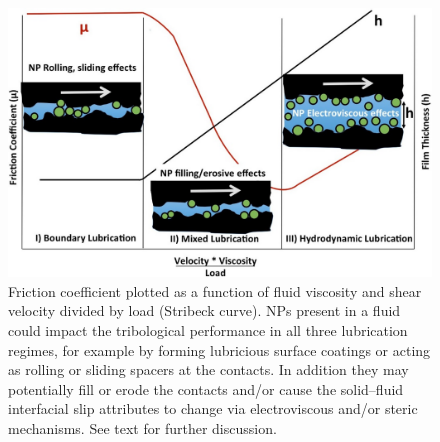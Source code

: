 \begin{figure}[hbtp]
	\centering
	\includegraphics[width=1.0\textwidth]{Chapter-4/fig1_png}
	\caption{Friction coefficient plotted as a function of fluid viscosity and shear velocity divided by load (Stribeck curve). NPs present in a fluid could impact the tribological performance in all three lubrication regimes, for example by forming lubricious surface coatings or acting as rolling or sliding spacers at the contacts. In addition they may potentially fill or erode the contacts and/or cause the solid–fluid interfacial slip attributes to change via electroviscous and/or steric mechanisms. See text for further discussion.}
	\label{fig1: 3 lub regimes}
\end{figure} 


